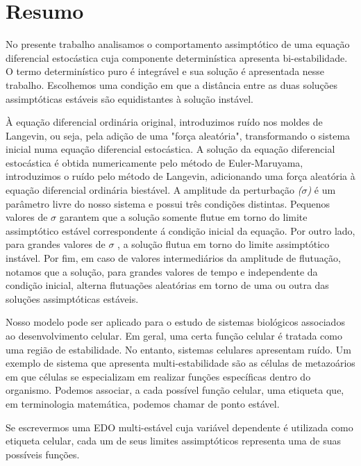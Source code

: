 \chapter*{Resumo}

No presente trabalho analisamos o comportamento assimptótico de uma equação diferencial estocástica cuja componente determinística apresenta bi-estabilidade.
O termo determinístico puro é integrável e sua solução é apresentada nesse trabalho. Escolhemos uma condição em que a distância entre as duas soluções assimptóticas estáveis são equidistantes à solução instável.

À equação diferencial ordinária original, introduzimos ruído nos moldes de Langevin, ou seja, pela adição de uma 
"força aleatória", transformando o sistema inicial numa equação diferencial estocástica.
A solução da equação diferencial estocástica é obtida numericamente pelo método de Euler-Maruyama, introduzimos o ruído pelo método de Langevin, adicionando uma força aleatória à equação diferencial ordinária biestável. 
A amplitude da perturbação \textit{($\sigma$)} é um parâmetro livre do nosso sistema e possui três condições distintas.
Pequenos valores de $\sigma$ garantem que a solução somente flutue em torno do limite assimptótico estável correspondente á condição inicial da equação. Por outro lado, para grandes valores de $\sigma$ , a solução flutua em torno do limite assimptótico instável. Por fim, em caso de valores intermediários da amplitude de flutuação, notamos que a solução, para grandes valores de tempo e independente da condição inicial, alterna flutuações aleatórias em torno de uma ou outra das soluções assimptóticas 
estáveis.

Nosso modelo pode ser aplicado para o estudo de sistemas biológicos associados ao desenvolvimento celular. Em geral, uma certa função celular é tratada como uma região de estabilidade. No entanto, sistemas celulares apresentam ruído.
Um exemplo de sistema que apresenta multi-estabilidade são as células de metazoários em que células se especializam em realizar funções específicas dentro do organismo. Podemos associar, a cada possível função celular, uma etiqueta que, em terminologia matemática, podemos chamar de ponto estável.

Se escrevermos uma EDO multi-estável cuja variável dependente é utilizada como etiqueta celular, cada um de seus limites assimptóticos representa uma de suas possíveis funções.
 
